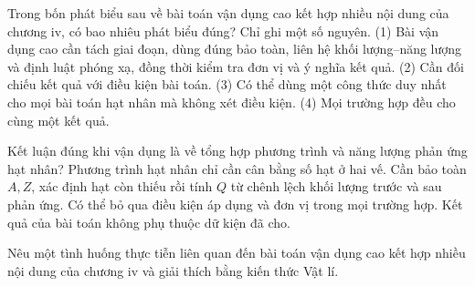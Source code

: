 \begin{ex}
Trong bốn phát biểu sau về bài toán vận dụng cao kết hợp nhiều nội dung của chương iv, có bao nhiêu phát biểu đúng? Chỉ ghi một số nguyên. (1) Bài vận dụng cao cần tách giai đoạn, dùng đúng bảo toàn, liên hệ khối lượng–năng lượng và định luật phóng xạ, đồng thời kiểm tra đơn vị và ý nghĩa kết quả. (2) Cần đối chiếu kết quả với điều kiện bài toán. (3) Có thể dùng một công thức duy nhất cho mọi bài toán hạt nhân mà không xét điều kiện. (4) Mọi trường hợp đều cho cùng một kết quả.
\end{ex}

\begin{ex}
Kết luận đúng khi vận dụng là về tổng hợp phương trình và năng lượng phản ứng hạt nhân?
\choice
{Phương trình hạt nhân chỉ cần cân bằng số hạt ở hai vế.}
{\True Cần bảo toàn $A,Z$, xác định hạt còn thiếu rồi tính $Q$ từ chênh lệch khối lượng trước và sau phản ứng.}
{Có thể bỏ qua điều kiện áp dụng và đơn vị trong mọi trường hợp.}
{Kết quả của bài toán không phụ thuộc dữ kiện đã cho.}
\end{ex}

\begin{bt}
Nêu một tình huống thực tiễn liên quan đến bài toán vận dụng cao kết hợp nhiều nội dung của chương iv và giải thích bằng kiến thức Vật lí.
\end{bt}

